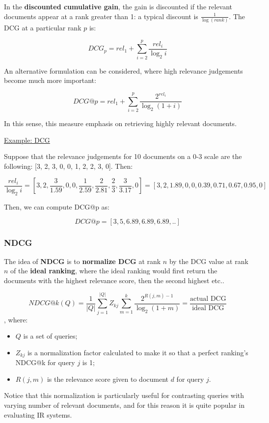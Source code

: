 In the \textbf{discounted cumulative gain}, the gain is discounted if the relevant documents appear at a rank greater than 1: a typical discount is $\frac{1}{\log(rank)}$. The DCG at a particular rank $p$ is:

$$
DCG_p = rel_1 + \sum_{i = 2}^p \frac{rel_i}{\log_2 i}
$$

An alternative formulation can be considered, where high relevance judgements become much more important:

$$
DCG@p = rel_1 + \sum_{i = 2}^p \frac{2^{rel_i}}{\log_2 (1 + i)}
$$

In this sense, this measure emphasis on retrieving highly relevant documents.

\underline{Example: DCG}

Suppose that the relevance judgements for 10 documents on a 0-3 scale are the following: [3, 2, 3, 0, 0, 1, 2, 2, 3, 0]. Then:

$$
\frac{rel_i}{\log_2 i} = [3, 2, \frac{3}{1.59}, 0, 0, \frac{1}{2.59}, \frac{2}{2.81}, \frac{2}{3}, \frac{3}{3.17}, 0] = [3, 2, 1.89, 0 , 0, 0.39, 0.71, 0.67, 0.95, 0]
$$

Then, we can compute DCG@p as:

$$
DCG@p = [3, 5, 6.89, 6.89, 6.89 , ..]
$$

\subsubsection{NDCG}
The idea of \textbf{NDCG} is to \textbf{normalize DCG} at rank $n$ by the DCG value at rank $n$ of the \textbf{ideal ranking}, where the ideal ranking would first return the documents with the highest relevance score, then the second highest etc.. 

$$
NDCG@k(Q) = \frac{1}{|Q|} \sum_{j = 1}^{|Q|} Z_{kj} \sum_{m = 1}^k \frac{2^{R(j,m) - 1}}{\log_2 (1+m)} = \frac{\text{actual DCG}}{\text{ideal DCG}}
$$
, where:

\begin{itemize}
    \item $Q$ is a set of queries;
    \item $Z_{kj}$ is a normalization factor calculated to make it so that a perfect ranking's NDCG@k for query $j$ is 1;
    \item $R(j,m)$ is the relevance score given to document $d$ for query $j$.
\end{itemize}

Notice that this normalization is particularly useful for contrasting queries with varying number of relevant documents, and for this reason it is quite popular in evaluating IR systems.

